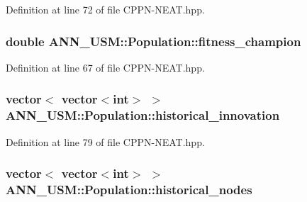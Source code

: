 Definition at line 72 of file C\-P\-P\-N-\/\-N\-E\-A\-T.\-hpp.

\hypertarget{class_a_n_n___u_s_m_1_1_population_a0622623a426583853cd7cc1e16bd9423}{
\subsubsection[{fitness\-\_\-champion}]{\setlength{\rightskip}{0pt plus 5cm}double A\-N\-N\-\_\-\-U\-S\-M\-::\-Population\-::fitness\-\_\-champion}}\label{class_a_n_n___u_s_m_1_1_population_a0622623a426583853cd7cc1e16bd9423}


Definition at line 67 of file C\-P\-P\-N-\/\-N\-E\-A\-T.\-hpp.

\hypertarget{class_a_n_n___u_s_m_1_1_population_a980dc824cafc3dd2750f87c3300cdb95}{
\subsubsection[{historical\-\_\-innovation}]{\setlength{\rightskip}{0pt plus 5cm}vector$<$ vector$<$int$>$ $>$ A\-N\-N\-\_\-\-U\-S\-M\-::\-Population\-::historical\-\_\-innovation}}\label{class_a_n_n___u_s_m_1_1_population_a980dc824cafc3dd2750f87c3300cdb95}


Definition at line 79 of file C\-P\-P\-N-\/\-N\-E\-A\-T.\-hpp.

\hypertarget{class_a_n_n___u_s_m_1_1_population_a5cbc92463b8bf0cc1031441ecfcd16bf}{
\subsubsection[{historical\-\_\-nodes}]{\setlength{\rightskip}{0pt plus 5cm}vector$<$ vector$<$int$>$ $>$ A\-N\-N\-\_\-\-U\-S\-M\-::\-Population\-::historical\-\_\-nodes}}\label{class_a_n_n___u_s_m_1_1_population_a5cbc92463b8bf0cc1031441ecfcd16bf}


